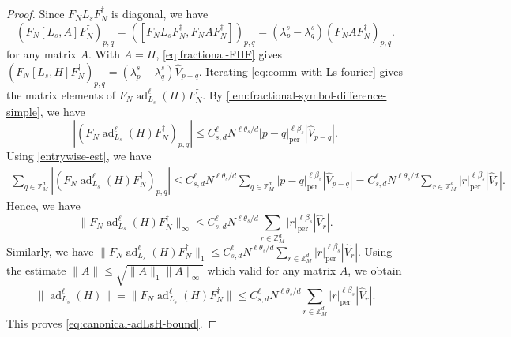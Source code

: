 \documentclass[10pt,reqno]{article}
\numberwithin{equation}{section}
\theoremstyle{plain}
\theoremstyle{definition}
\begin{document}
\begin{proof}
Since \(F_NL_sF_N^\dagger\) is diagonal, we have
\begin{equation}\label{eq:comm-with-Ls-fourier}
(F_N[L_s,A]F_N^\dagger)_{p,q} = ([F_NL_sF_N^\dagger,F_NAF_N^\dagger])_{p,q} =(\lambda_p^s-\lambda_q^s) ( F_NAF_N^\dagger )_{p,q}.
\end{equation}
for any matrix \(A\). With \(A=H\), \cref{eq:fractional-FHF} gives $(F_N[L_s,H]F_N^\dagger)_{p,q} = (\lambda_p^s-\lambda_q^s)\widehat V_{p-q}$. 
Iterating \cref{eq:comm-with-Ls-fourier} gives the matrix elements of
$F_N\operatorname{ad}_{L_s}^\ell(H)F_N^\dagger$. By \cref{lem:fractional-symbol-difference-simple}, we have
\begin{equation}\label{entrywise-est}
|( F_N\operatorname{ad}_{L_s}^\ell(H)F_N^\dagger)_{p,q}| \leq C_{s,d}^\ell N^{\ell\theta_s/d} |p-q|_{\operatorname{per}}^{\ell\beta_s} |\widehat V_{p-q}|.
\end{equation}
Using \cref{entrywise-est}, we have
\begin{align}
\sum_{q \in \mathbb Z^d_M} |(F_N\operatorname{ad}_{L_s}^\ell(H)F_N^\dagger)_{p,q}| \leq C_{s,d}^\ell N^{\ell\theta_s/d} \sum_{q \in \mathbb Z^d_M} |p-q|_{\operatorname{per}}^{\ell\beta_s} |\widehat V_{p-q}|= C_{s,d}^\ell N^{\ell\theta_s/d} \sum_{r \in \mathbb Z^d_M} |r|_{\operatorname{per}}^{\ell\beta_s} |\widehat V_r|.
\end{align}
Hence, we have
\begin{equation}\label{eq:Bk-infty-bound}
\|F_N\operatorname{ad}_{L_s}^\ell(H)F_N^\dagger\|_\infty \leq C_{s,d}^\ell N^{\ell\theta_s/d} \sum_{r \in \mathbb Z^d_M} |r|_{\operatorname{per}}^{\ell\beta_s} |\widehat V_r|.
\end{equation}
Similarly, we have $\|F_N\operatorname{ad}_{L_s}^\ell(H)F_N^\dagger\|_1 \leq C_{s,d}^\ell N^{\ell\theta_s/d} \sum_{r \in \mathbb Z^d_M} |r|_{\operatorname{per}}^{\ell\beta_s} |\widehat V_r|$.  Using the estimate \(\|A\|\leq \sqrt{\|A\|_1\|A\|_\infty}\) which valid for any matrix \(A\), we obtain
\begin{equation}
\|\operatorname{ad}_{L_s}^\ell(H)\| = \|F_N\operatorname{ad}_{L_s}^\ell(H)F_N^\dagger\| \leq C_{s,d}^\ell N^{\ell\theta_s/d} \sum_{r \in \mathbb Z^d_M}|r|_{\operatorname{per}}^{\ell\beta_s} |\widehat V_r|.
\end{equation}
This proves \cref{eq:canonical-adLsH-bound}.
\end{proof}
\end{document}
